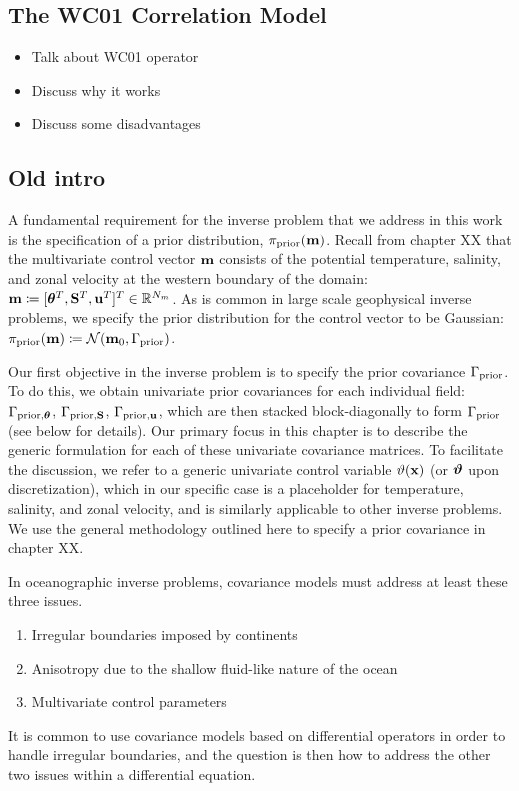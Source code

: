 \subsection{The WC01 Correlation Model}
\begin{itemize}
    \item Talk about WC01 operator
    \item Discuss why it works
    \item Discuss some disadvantages
\end{itemize}


\subsection{Old intro}
A fundamental requirement for the inverse problem that we address in this work
is the specification of a prior distribution, $\pi_{\text{prior}}(\mathbf{m})$.
Recall from chapter XX that the multivariate control vector
$\mathbf{m}$ consists of the
potential temperature, salinity, and zonal velocity at the western boundary of
the domain:
$\mathbf{m} \coloneqq [{\bm{\theta}}^T,\mathbf{S}^T,\mathbf{u}^T]^T \in\mathbb{R}^{N_m}$.
As is common in large scale geophysical inverse problems, we specify the prior
distribution for the control vector
to be Gaussian: $\pi_{\text{prior}}(\mathbf{m}) \coloneqq \mathcal{N}(\mathbf{m}_0, \Gamma_{\text{prior}})$.

Our first objective in the inverse problem is to specify the prior
covariance $\Gamma_{\text{prior}}$.
To do this, we obtain univariate prior covariances for
each individual field: $\Gamma_{\text{prior,}{\bm{\theta}}}$, $\Gamma_{\text{prior,}\mathbf{S}}$,
$\Gamma_{\text{prior,}\mathbf{u}}$, which are then stacked block-diagonally to form
$\Gamma_{\text{prior}}$ (see below for details).
Our primary focus in this chapter is to describe the generic formulation for
each of these univariate covariance matrices.
To facilitate the discussion, we refer to a generic univariate control variable
$\vartheta(\mathbf{x})$ (or $\bm{\vartheta}$ upon discretization), which in our specific case is a
placeholder for temperature, salinity, and zonal velocity, and is similarly
applicable to other inverse problems.
We use the general methodology outlined here to specify a prior covariance in
chapter XX.

In oceanographic inverse problems, covariance models must address at least
these three issues.
\begin{enumerate}
    \item Irregular boundaries imposed by continents
    \item Anisotropy due to the shallow fluid-like nature of the ocean
    \item Multivariate control parameters
\end{enumerate}
It is common to use covariance models based on differential operators in order
to handle irregular boundaries, and the question is then how to address the
other two issues within a differential equation.


